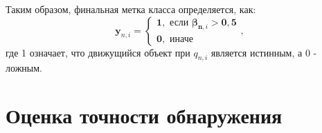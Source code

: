 Таким образом, финальная метка класса определяется, как:
\begin{equation}
\boldsymbol{y}_{n, i}=\left\{\begin{array}{l}
\mathbf{1}, \text { если } \boldsymbol{\beta}_{\boldsymbol{n}, i}>\mathbf{0 , 5} \\
\mathbf{0 ,} \text { иначе }
\end{array},\right.
\end{equation}
где 1 означает, что движущийся объект при $q_{n, i}$ является истинным, а 0 - ложным.

\section{Оценка точности обнаружения}



